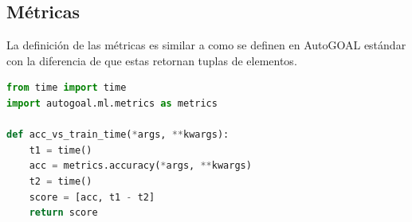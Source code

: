 \subsection{M\'etricas}
La definici\'on de las m\'etricas es similar a como se definen en AutoGOAL est\'andar con la diferencia de que estas retornan tuplas de elementos.

\begin{lstlisting}[caption=Ejemplo de m\'etrica: accuracy contra tiempo, language=Python]
from time import time
import autogoal.ml.metrics as metrics

def acc_vs_train_time(*args, **kwargs):
    t1 = time()
    acc = metrics.accuracy(*args, **kwargs)
    t2 = time()
    score = [acc, t1 - t2]
    return score
\end{lstlisting}
